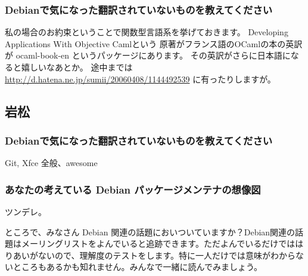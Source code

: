 \documentclass[mingoth,a4paper]{jsarticle}
\begin{document}
\subsubsection{Debianで気になった翻訳されていないものを教えてください}
私の場合のお約束ということで関数型言語系を挙げておきます。
Developing Applications With Objective Camlという
原著がフランス語のOCamlの本の英訳が ocaml-book-en というパッケージにあります。
その英訳がさらに日本語になると嬉しいなあとか。
途中までは \url{http://d.hatena.ne.jp/sumii/20060408/1144492539} に有ったりしますが。

\subsection{岩松}
\subsubsection{Debianで気になった翻訳されていないものを教えてください}
Git, Xfce 全般、awesome
\subsubsection{あなたの考えている Debian パッケージメンテナの想像図}
ツンデレ。


ところで、みなさん Debian 関連の話題においついていますか？Debian関連の話
題はメーリングリストをよんでいると追跡できます。ただよんでいるだけではは
りあいがないので、理解度のテストをします。特に一人だけでは意味がわからな
いところもあるかも知れません。みんなで一緒に読んでみましょう。
\end{document}
